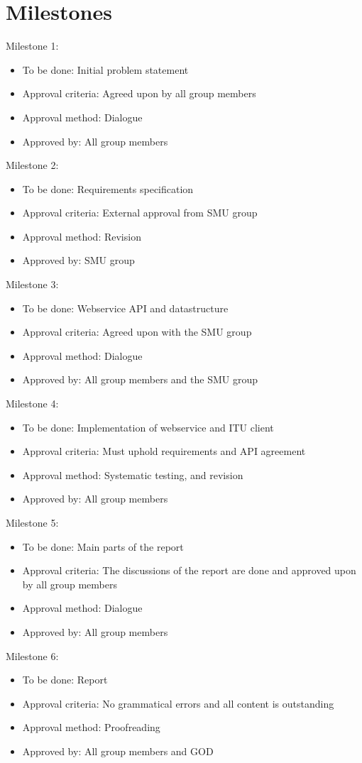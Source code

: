 \section{Milestones}
\label{app:milestones}
Milestone 1:
\begin{itemize}
\item To be done: Initial problem statement
\item Approval criteria: Agreed upon by all group members
\item Approval method: Dialogue
\item Approved by: All group members
\end{itemize}

Milestone 2:
\begin{itemize}
\item To be done: Requirements specification
\item Approval criteria: External approval from SMU group
\item Approval method: Revision
\item Approved by: SMU group
\end{itemize}

Milestone 3:
\begin{itemize}
\item To be done: Webservice API and datastructure
\item Approval criteria: Agreed upon with the SMU group
\item Approval method: Dialogue
\item Approved by: All group members and the SMU group
\end{itemize}

Milestone 4:
\begin{itemize}
\item To be done: Implementation of webservice and ITU client 
\item Approval criteria: Must uphold requirements and API agreement
\item Approval method: Systematic testing, and revision
\item Approved by: All group members
\end{itemize}

Milestone 5:
\begin{itemize}
\item To be done: Main parts of the report 
\item Approval criteria: The discussions of the report are done and approved upon by all group members
\item Approval method: Dialogue
\item Approved by: All group members
\end{itemize}

Milestone 6:
\begin{itemize}
\item To be done: Report
\item Approval criteria: No grammatical errors and all content is outstanding
\item Approval method: Proofreading
\item Approved by: All group members and GOD
\end{itemize}

